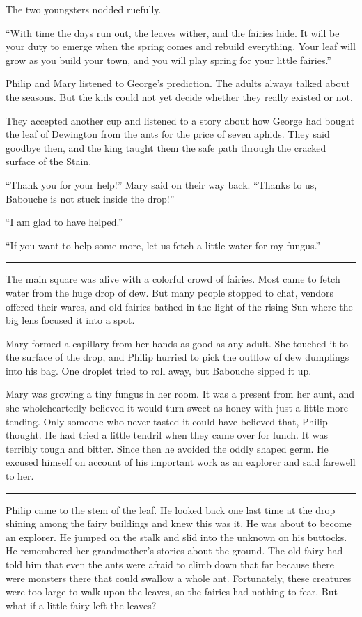 \documentclass[10pt, draft]{memoir}
\renewcommand{\pfbreakdisplay}{\bigskip \ding{166} \bigskip}
\newcommand{\secbreak}{\fancybreak{\pfbreakdisplay}}
\begin{document}
The two youngsters nodded ruefully.

``With time the days run out, the leaves wither, and the fairies hide. It will
be your duty to emerge when the spring comes and rebuild everything. Your leaf
will grow as you build your town, and you will play spring for your little
fairies.''

Philip and Mary listened to George's prediction. The adults always talked about
the seasons. But the kids could not yet decide whether they really existed or
not.

They accepted another cup and listened to a story about how George had bought
the leaf of Dewington from the ants for the price of seven aphids. They said
goodbye then, and the king taught them the safe path through the cracked
surface of the Stain.

``Thank you for your help!'' Mary said on their way back. ``Thanks to us,
Babouche is not stuck inside the drop!''

``I am glad to have helped.''

``If you want to help some more, let us fetch a little water for my fungus.''

\secbreak

The main square was alive with a colorful crowd of fairies. Most came to fetch
water from the huge drop of dew. But many people stopped to chat, vendors
offered their wares, and old fairies bathed in the light of the rising Sun
where the big lens focused it into a spot.

Mary formed a capillary from her hands as good as any adult. She touched it to
the surface of the drop, and Philip hurried to pick the outflow of dew
dumplings into his bag. One droplet tried to roll away, but Babouche sipped it
up.

Mary was growing a tiny fungus in her room. It was a present from her aunt, and
she wholeheartedly believed it would turn sweet as honey with just a little
more tending. Only someone who never tasted it could have believed that, Philip
thought. He had tried a little tendril when they came over for lunch. It was
terribly tough and bitter. Since then he avoided the oddly shaped germ. He
excused himself on account of his important work as an explorer and said
farewell to her.

\secbreak

Philip came to the stem of the leaf. He looked back one last time at the drop
shining among the fairy buildings and knew this was it. He was about to become
an explorer. He jumped on the stalk and slid into the unknown on his buttocks.
He remembered her grandmother's stories about the ground. The old fairy had
told him that even the ants were afraid to climb down that far because there
were monsters there that could swallow a whole ant. Fortunately, these
creatures were too large to walk upon the leaves, so the fairies had nothing to
fear. But what if a little fairy left the leaves?
\end{document}
